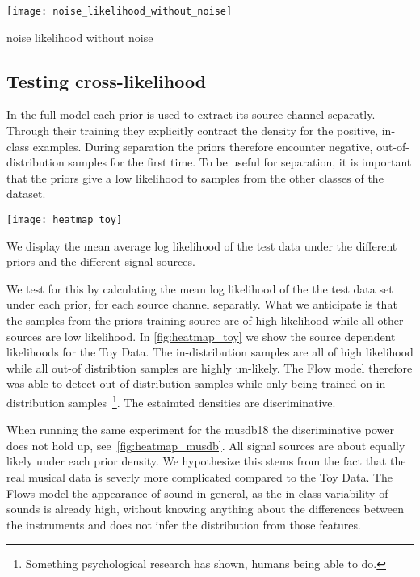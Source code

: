 \begin{marginfigure}
    \texttt{[image: noise\_likelihood\_without\_noise]}%
    \caption{noise likelihood without noise}%
    \label{fig:noise_ll_noise}
\end{marginfigure}

\subsection{Testing cross-likelihood}
In the full model each prior is used to extract its source channel separatly. Through their training they explicitly contract the density for the positive, in-class examples. During separation the priors therefore encounter negative, out-of-distribution samples for the first time. To be useful for separation, it is important that the priors give a low likelihood to samples from the other classes of the dataset.

\begin{marginfigure}
    \texttt{[image: heatmap\_toy]}%
    \caption{We display the mean average log likelihood of the test data under the different priors and the different signal sources.}%
    \label{fig:heatmap_toy}
\end{marginfigure}

We test for this by calculating the mean log likelihood of the the test data set under each prior, for each source channel separatly. What we anticipate is that the samples from the priors training source are of high likelihood while all other sources are low likelihood. In \cref{fig:heatmap_toy} we show the source dependent likelihoods for the Toy Data. The in-distribution samples are all of high likelihood while all out-of distribtion samples are highly un-likely. The Flow model therefore was able to detect out-of-distribution samples while only being trained on in-distribution samples~\footnote{Something psychological research has shown, humans being able to do.}. The estaimted densities are discriminative.

When running the same experiment for the musdb18 the discriminative power does not hold up, see~\cref{fig:heatmap_musdb}. All signal sources are about equally likely under each prior density. We hypothesize this stems from the fact that the real musical data is severly more complicated compared to the Toy Data. The Flows model the appearance of sound in general, as the in-class variability of sounds is already high, without knowing anything about the  differences between the instruments and does not infer the distribution from those features.

